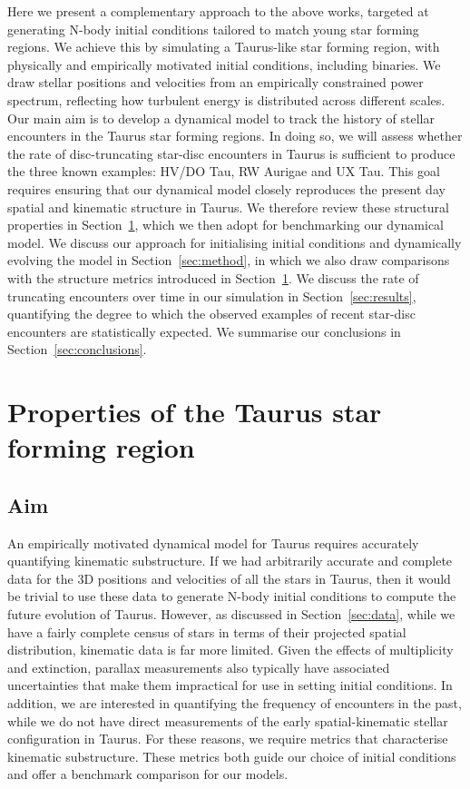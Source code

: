 \documentclass{aa}
\begin{document}
Here we present a complementary approach to the above works, targeted at generating N-body initial conditions tailored to match young star forming regions. We achieve this by simulating a Taurus-like star forming region, with physically and empirically motivated initial conditions, including binaries. We draw stellar positions and velocities from an empirically constrained power spectrum, reflecting how turbulent energy is distributed across different scales. Our main aim is to develop a dynamical model to track the history of stellar encounters in the Taurus star forming regions. In doing so, we will assess whether the rate of disc-truncating star-disc encounters in Taurus is sufficient to produce the three known examples: HV/DO Tau, RW Aurigae and UX Tau. This goal requires ensuring that our dynamical model closely reproduces the present day spatial and kinematic structure in Taurus. We therefore review these structural properties in Section~\ref{sec:Taurus_review}, which we then adopt for benchmarking our dynamical model. We discuss our approach for initialising initial conditions and dynamically evolving the model in Section~\ref{sec:method}, in which we also draw comparisons with the structure metrics introduced in Section~\ref{sec:Taurus_review}. We discuss the rate of truncating encounters over time in our simulation in Section~\ref{sec:results}, quantifying the degree to which the observed examples of recent star-disc encounters are statistically expected. We summarise our conclusions in Section~\ref{sec:conclusions}. 


\section{Properties of the Taurus star forming region }

\label{sec:Taurus_review}

\subsection{Aim}

An empirically motivated dynamical model for Taurus requires accurately quantifying kinematic substructure. If we had arbitrarily accurate and complete data for the 3D positions and velocities of all the stars in Taurus, then it would be trivial to use these data to generate N-body initial conditions to compute the future evolution of Taurus. However, as discussed in Section~\ref{sec:data}, while we have a fairly complete census of stars in terms of their projected spatial distribution, kinematic data is far more limited. Given the effects of multiplicity and extinction, parallax measurements also typically have associated uncertainties that make them impractical for use in setting initial conditions. In addition, we are interested in quantifying the frequency of encounters in the past, while we do not have direct measurements of the early spatial-kinematic stellar configuration in Taurus. For these reasons, we require metrics that characterise kinematic substructure. These metrics both guide our choice of initial conditions and offer a benchmark comparison for our models.
\end{document}
